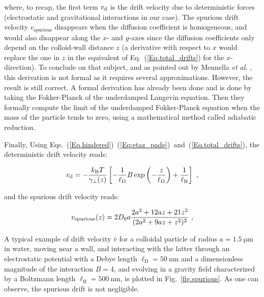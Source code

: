 where, to recap, the first term $v_\textnormal{d}$ is the drift velocity due to deterministic forces (electrostatic and gravitational interactions in our case). The spurious drift velocity $v_\mathrm{spurious}$ disappears when the diffusion coefficient is homogeneous, and would also disappear along the $x$- and $y$-axes since the diffusion coefficients only depend on the colloid-wall distance $z$ (a derivative with respect to $x$ would replace the one in $z$ in the equivalent of Eq.~(\ref{Eq.total_drifts}) for the $x$-direction). To conclude on that subject, and as pointed out by Mennella \textit{et al.} \cite{mannella_ito_2012}, this derivation is not formal as it requires several approximations. However, the result is still correct. A formal derivation has already been done \cite{sancho_adiabatic_1982} and is done by taking the Fokker-Planck of the underdamped Langevin equation. Then they formally compute the limit of the underdamped Fokker-Planck equation when the mass of the particle tends to zero, using a mathematical method called adiabatic reduction.

Finally, Using  Eqs.~(\ref{Eq.hindered})~(\ref{Eq:etaz_pade})~and~(\ref{Eq.total_drifts}), the deterministic drift velocity reads:

\begin{equation}
	v_\textnormal{d} =- \frac{k_\mathrm{B}T}{\gamma_\bot(z)} \left[- \frac{1}{\ell_\mathrm{D}} B \exp \left(- \frac{z}{\ell_\mathrm{D}}\right) + \frac{1}{\ell_\mathrm{B}}\right] ~,
\end{equation}

and the spurious drift velocity reads:

\begin{equation}
	v_\textnormal{spurious} (z)= 2  D_0 a\frac{2a^2 + 12 az + 21 z^2}{(2 a^2 + 9az + z^2) ^2} ~,
	\label{Eq.spurious_drift}
\end{equation}

A typical example of drift velocity $\bar{v}$ for a colloidal particle of radius $a = 1.5 ~\mathrm{\mu m}$ in water, moving near a wall, and interacting with the latter through an electrostatic potential with a Debye length $\ell_\mathrm{D} = 50 ~ \mathrm{nm}$ and a dimensionless magnitude of the interaction $B = 4$, and evolving in a gravity field characterized by a Boltzmann length $\ell_\mathrm{B} = 500 ~ \mathrm{nm}$, is plotted in Fig.~\ref{fig.spurious}. As one can observe, the spurious drift is not negligible.

